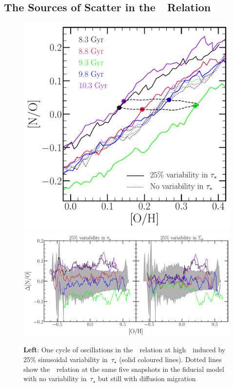 \documentclass[ms.tex]{subfiles}
\begin{document}
\subsection{The Sources of Scatter in the~\ohno~Relation}
\label{sec:results:schaefer_comp}

\begin{figure}
\centering
\includegraphics[scale = 0.31]{no_oh_sfevar.pdf}
\includegraphics[scale = 0.33]{delta_no_schaefercomp.pdf}
\caption{
\textbf{Left}: One cycle of oscillations in the~\ohno~relation at
high~\oh~induced by 25\% sinusoidal variability in~$\tau_\star$ (solid coloured
lines).
Dotted lines show the~\ohno~relation at the same five snapshots in the fiducial
model with no variability in~$\tau_\star$ but still with diffusion migration
}
\end{figure}
\end{document}
